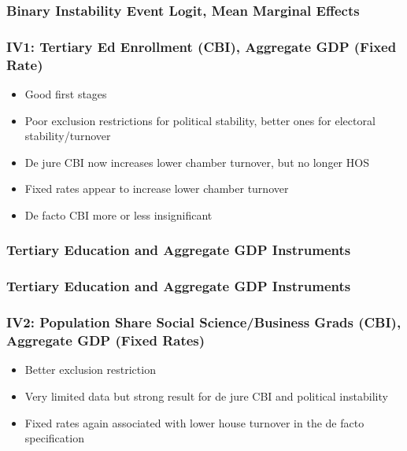 \documentclass{beamer}
\begin{document}
    \begin{frame}
        \frametitle{Binary Instability Event Logit, Mean Marginal Effects}
        {
            \let\oldcentering\centering
            \renewcommand\centering{\tiny\oldcentering}
            
        }
    \end{frame}

    \begin{frame}
        \frametitle{IV1: Tertiary Ed Enrollment (CBI), Aggregate GDP (Fixed Rate)}
        \begin{itemize}
            \item Good first stages
            \item Poor exclusion restrictions for political stability, better ones for electoral stability/turnover
            \item De jure CBI now increases lower chamber turnover, but no longer HOS
            \item Fixed rates appear to increase lower chamber turnover
            \item De facto CBI more or less insignificant
        \end{itemize}
    \end{frame}

    \begin{frame}
        \frametitle{Tertiary Education and Aggregate GDP Instruments}
        {
            \let\oldcentering\centering
            \renewcommand\centering{\tiny\oldcentering}
            
        }
    \end{frame}

    \begin{frame}
        \frametitle{Tertiary Education and Aggregate GDP Instruments}
        {
            \let\oldcentering\centering
            \renewcommand\centering{\tiny\oldcentering}
            
        }
    \end{frame}

    \begin{frame}
        \frametitle{IV2: Population Share Social Science/Business Grads (CBI), Aggregate GDP (Fixed Rates)}
        \begin{itemize}
            \item Better exclusion restriction
            \item Very limited data but strong result for de jure CBI and political instability
            \item Fixed rates again associated with lower house turnover in the de facto specification
        \end{itemize}
    \end{frame}
\end{document}
